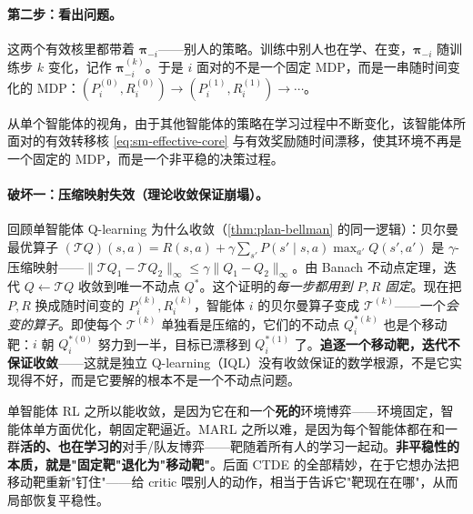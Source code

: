 \paragraph{第二步：看出问题。}
这两个有效核里都带着 $\boldsymbol{\pi}_{-i}$——别人的策略。训练中别人也在学、在变，$\boldsymbol{\pi}_{-i}$ 随训练步 $k$ 变化，记作 $\boldsymbol{\pi}_{-i}^{(k)}$。于是 $i$ 面对的不是一个固定 MDP，而是一串随时间变化的 MDP：$(P_i^{(0)},R_i^{(0)})\to(P_i^{(1)},R_i^{(1)})\to\cdots$。

\begin{definition}\label{def:sm-nonstationarity}
从单个智能体的视角，由于其他智能体的策略在学习过程中不断变化，该智能体所面对的有效转移核 \cref{eq:sm-effective-core} 与有效奖励随时间漂移，使其环境不再是一个固定的 MDP，而是一个非平稳的决策过程。
\end{definition}

\paragraph{破坏一：压缩映射失效（理论收敛保证崩塌）。}
回顾单智能体 Q-learning 为什么收敛（\cref{thm:plan-bellman} 的同一逻辑）：贝尔曼最优算子 $(\mathcal{T}Q)(s,a)=R(s,a)+\gamma\sum_{s'}P(s'\mid s,a)\max_{a'}Q(s',a')$ 是 $\gamma$-压缩映射——$\|\mathcal{T}Q_1-\mathcal{T}Q_2\|_\infty\le\gamma\|Q_1-Q_2\|_\infty$。由 Banach 不动点定理，迭代 $Q\leftarrow\mathcal{T}Q$ 收敛到唯一不动点 $Q^*$。这个证明的\emph{每一步都用到 $P,R$ 固定}。现在把 $P,R$ 换成随时间变的 $P_i^{(k)},R_i^{(k)}$，智能体 $i$ 的贝尔曼算子变成 $\mathcal{T}^{(k)}$——一个\emph{会变的算子}。即使每个 $\mathcal{T}^{(k)}$ 单独看是压缩的，它们的不动点 $Q_i^{*(k)}$ 也是个移动靶：$i$ 朝 $Q_i^{*(0)}$ 努力到一半，目标已漂移到 $Q_i^{*(1)}$ 了。\textbf{追逐一个移动靶，迭代不保证收敛}——这就是独立 Q-learning（IQL）没有收敛保证的数学根源，不是它实现得不好，而是它要解的根本不是一个不动点问题。

\begin{insight}
单智能体 RL 之所以能收敛，是因为它在和一个\textbf{死的}环境博弈——环境固定，智能体单方面优化，朝固定靶逼近。MARL 之所以难，是因为每个智能体都在和一群\textbf{活的、也在学习的}对手/队友博弈——靶随着所有人的学习一起动。\textbf{非平稳性的本质，就是"固定靶"退化为"移动靶"}。后面 CTDE 的全部精妙，在于它想办法把移动靶重新"钉住"——给 critic 喂别人的动作，相当于告诉它"靶现在在哪"，从而局部恢复平稳性。
\end{insight}

